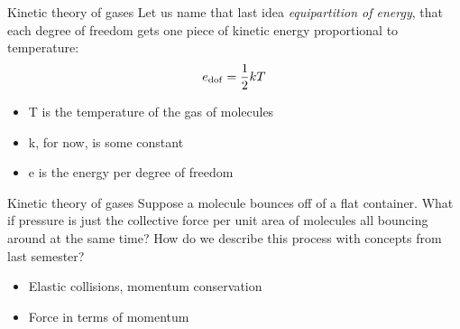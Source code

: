 \documentclass{beamer}
\begin{document}
\begin{frame}{Kinetic theory of gases}
Let us name that last idea \textit{equipartition of energy}, that each \alert{degree of freedom} gets one piece of kinetic energy proportional to temperature:
\begin{equation}
e_{\rm dof} = \frac{1}{2}kT
\end{equation}
\begin{itemize}
\item T is the temperature of the gas of molecules
\item k, for now, is some constant
\item e is the energy per degree of freedom
\end{itemize}
\end{frame}

\begin{frame}{Kinetic theory of gases}
Suppose a molecule bounces off of a flat container.  What if pressure is just the collective force per unit area of molecules all bouncing around at the same time?  How do we describe this process with concepts from last semester?
\begin{itemize}
\item Elastic collisions, momentum conservation
\item Force in terms of momentum
\end{itemize}
\end{frame}
\end{document}
